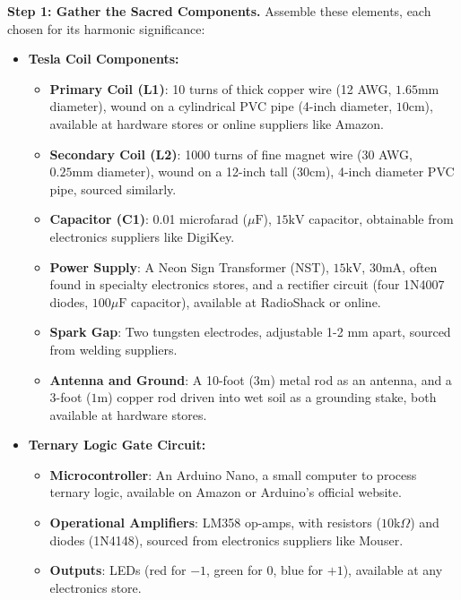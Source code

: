 \textbf{Step 1: Gather the Sacred Components.} Assemble these elements, each chosen for its harmonic significance:
\begin{itemize}
    \item \texttt{} \textbf{Tesla Coil Components:}
    \begin{itemize}
        \item \texttt{} \textbf{Primary Coil (L1)}: 10 turns of thick copper wire (12 AWG, $1.65 \mathrm{mm}$ diameter), wound on a cylindrical PVC pipe (4-inch diameter, $10 \mathrm{cm}$), available at hardware stores or online suppliers like Amazon.
        \item \texttt{} \textbf{Secondary Coil (L2)}: 1000 turns of fine magnet wire (30 AWG, $0.25 \mathrm{mm}$ diameter), wound on a 12-inch tall ($30 \mathrm{cm}$), 4-inch diameter PVC pipe, sourced similarly.
        \item \texttt{} \textbf{Capacitor (C1)}: 0.01 microfarad ($\mu\mathrm{F}$), $15 \mathrm{kV}$ capacitor, obtainable from electronics suppliers like DigiKey.
        \item \texttt{} \textbf{Power Supply}: A Neon Sign Transformer (NST), $15 \mathrm{kV}$, $30 \mathrm{mA}$, often found in specialty electronics stores, and a rectifier circuit (four 1N4007 diodes, $100 \mu\mathrm{F}$ capacitor), available at RadioShack or online.
        \item \texttt{} \textbf{Spark Gap}: Two tungsten electrodes, adjustable 1-2 mm apart, sourced from welding suppliers.
        \item \texttt{} \textbf{Antenna and Ground}: A 10-foot ($3 \mathrm{m}$) metal rod as an antenna, and a 3-foot ($1 \mathrm{m}$) copper rod driven into wet soil as a grounding stake, both available at hardware stores.
    \end{itemize}
    \item \texttt{} \textbf{Ternary Logic Gate Circuit:}
    \begin{itemize}
        \item \texttt{} \textbf{Microcontroller}: An Arduino Nano, a small computer to process ternary logic, available on Amazon or Arduino's official website.
        \item \texttt{} \textbf{Operational Amplifiers}: LM358 op-amps, with resistors ($10 \mathrm{k}\Omega$) and diodes (1N4148), sourced from electronics suppliers like Mouser.
        \item \texttt{} \textbf{Outputs}: LEDs (red for $-1$, green for $0$, blue for $+1$), available at any electronics store.

\end{itemize}
\end{itemize}

